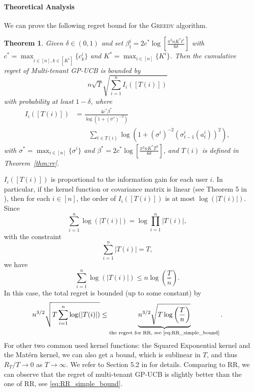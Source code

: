 \documentclass[letterpaper]{vldb}
\newcommand{\greedy}{\textsc{Greedy}\xspace}
\newtheorem{theorem}{Theorem}
\begin{document}
\vspace{-0.5em}
\paragraph*{Theoretical Analysis} We
can prove the following regret bound
for the \greedy algorithm.

\vspace{-0.5em}
\begin{theorem}
  \label{thm:multi-cost}
  Given $\delta\in (0,1)$ and set $\beta_t^i = 2c^\ast \log\left[ \frac{\pi^2 n K^\ast t^i}{6\delta} \right]$ with $c^\ast = \max_{i\in [n], k\in [K^i]}\{c^i_k\}$ and $K^\ast = \max_{i\in [n]}\{K^i\}$. Then the
  cumulative regret of Multi-tenant GP-UCB is bounded  by
  \[
    n \sqrt{T}\sqrt{\sum_{i=1}^n I_i([T(i)])}
  \]
  with probability at least $1-\delta$,
  where
  \begin{align*}
    I_i([T(i)]) & =  \frac{4c^\ast \beta^\ast}{\log(1 + (\sigma^\ast)^{-2})}\\
    &\qquad \sum_{t\in T(i)} \log\left(1 + (\sigma^i)^{-2}(\sigma^i_{t-1}(a^i_{t}))^2\right),
  \end{align*}
  with $\sigma^\ast= \max_{i\in [n]}\{\sigma^i\}$  and $\beta^\ast = 2c^\ast \log\left[\frac{\pi^2 n K^\ast T^2}{6\delta}\right]$, and $T(i)$ is defined in Theorem~\ref{thm:rr}.
\end{theorem}

$I_i([T(i)])$ is proportional to the information gain for each user $i$. In particular, if the kernel function or covariance matrix is linear (see
  Theorem 5 in \cite{SrinivasKKS10}), then for each $i\in [n]$, the
  order of $I_i([T(i)])$ is at most $\log(|T(i)|)$. Since
  \[
    \sum_{i=1}^n \log(|T(i)|) = \log \prod_{i=1}^n |T(i)|,
    \]
  with the constraint
  \[
    \sum_{i=1}^n|T(i)| = T,
  \]
  we have
  \[
    \sum_{i=1}^n \log(|T(i)|) \le n \log \left(\frac{T}{n}\right).
  \]
  In this case, the total regret is bounded (up to some constant) by
  \[
 n^{3/2}\sqrt{T\sum_{i=1}^n \log(|T(i)|)}  \leq \underbrace{n^{3/2}\sqrt{T \log\left(\frac{T}{n}\right)}}_{\text{the regret for RR, see \eqref{eq:RR_simple_bound}}}.
  \]
For other two common used kernel functions: the Squared Exponential kernel and the Mat\'{e}rn kernel, we can also get a bound, which is sublinear in $T$, and thus $R_T/T \to 0$ as $T\to\infty$. We refer to Section 5.2 in \cite{SrinivasKKS10} for details. Comparing to RR, we can observe that the regret of multi-tenant GP-UCB is slightly better than the one of RR, see \eqref{eq:RR_simple_bound}.  
\end{document}
